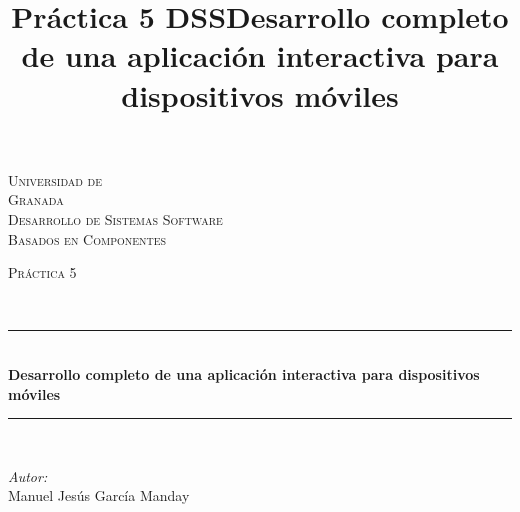\documentclass[10pt]{article}
\title{Práctica 5 DSS}
\title{Desarrollo completo de una aplicación interactiva para dispositivos móviles}
\begin{document}
\begin{center}																		%
\newcommand{\HRule}{\rule{\linewidth}{0.5mm}}									%
\begin{minipage}{0.48\textwidth} \begin{flushleft}
\end{flushleft}\end{minipage}
\begin{minipage}{0.48\textwidth} \begin{flushright}
\end{flushright}\end{minipage}

\vspace*{-1.5cm}								%
\textsc{\huge Universidad de\\ \vspace{5px} Granada}\\[1.5cm]	

\textsc{\LARGE Desarrollo de Sistemas Software\\ \vspace{5px}  Basados en Componentes}\\[1.5cm]													%

\begin{minipage}{0.9\textwidth} 
\begin{center}																					%
\textsc{\LARGE Práctica 5}
\end{center}
\end{minipage}\\[0.5cm]
 			\vspace*{1cm}																		%
\HRule \\[0.4cm]																	%
{ \huge \bfseries Desarrollo completo de una aplicación interactiva para dispositivos móviles}\\[0.4cm]	%
\HRule \\[1.5cm]																	%
\begin{minipage}{0.46\textwidth}													%
\begin{flushleft} \large															%
\emph{Autor:}\\	
Manuel Jesús García Manday\\


\end{flushleft}
\end{minipage}
\end{center}
\end{document}
